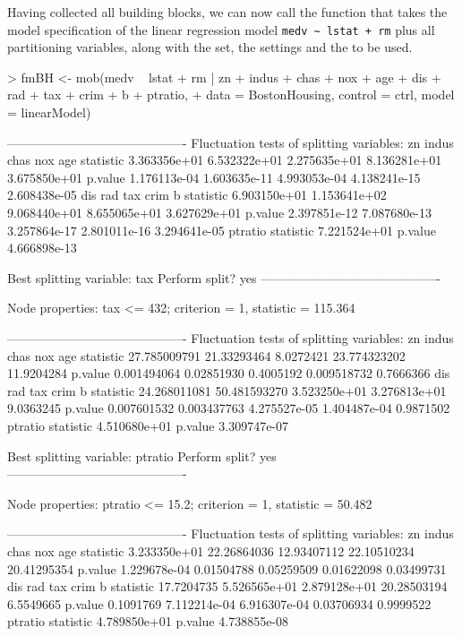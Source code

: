 \documentclass{Z}
\begin{document}
Having collected all building blocks, we can now call the function 
that takes the model specification of the linear regression model \verb:medv ~ lstat + rm:
plus all partitioning variables, along with the  set, the 
settings and the  to be used.

\begin{Schunk}
\begin{Sinput}
> fmBH <- mob(medv ~ lstat + rm | zn + indus + chas + nox + age + dis + rad + tax + crim + b + ptratio,
+   data = BostonHousing, control = ctrl, model = linearModel)
\end{Sinput}
\begin{Soutput}
-------------------------------------------
Fluctuation tests of splitting variables:
                    zn        indus         chas          nox          age
statistic 3.363356e+01 6.532322e+01 2.275635e+01 8.136281e+01 3.675850e+01
p.value   1.176113e-04 1.603635e-11 4.993053e-04 4.138241e-15 2.608438e-05
                   dis          rad          tax         crim            b
statistic 6.903150e+01 1.153641e+02 9.068440e+01 8.655065e+01 3.627629e+01
p.value   2.397851e-12 7.087680e-13 3.257864e-17 2.801011e-16 3.294641e-05
               ptratio
statistic 7.221524e+01
p.value   4.666898e-13

Best splitting variable: tax
Perform split? yes
-------------------------------------------

Node properties:
tax <= 432; criterion = 1, statistic = 115.364

-------------------------------------------
Fluctuation tests of splitting variables:
                    zn       indus      chas          nox        age
statistic 27.785009791 21.33293464 8.0272421 23.774323202 11.9204284
p.value    0.001494064  0.02851930 0.4005192  0.009518732  0.7666366
                   dis          rad          tax         crim         b
statistic 24.268011081 50.481593270 3.523250e+01 3.276813e+01 9.0363245
p.value    0.007601532  0.003437763 4.275527e-05 1.404487e-04 0.9871502
               ptratio
statistic 4.510680e+01
p.value   3.309747e-07

Best splitting variable: ptratio
Perform split? yes
-------------------------------------------

Node properties:
ptratio <= 15.2; criterion = 1, statistic = 50.482

-------------------------------------------
Fluctuation tests of splitting variables:
                    zn       indus        chas         nox         age
statistic 3.233350e+01 22.26864036 12.93407112 22.10510234 20.41295354
p.value   1.229678e-04  0.01504788  0.05259509  0.01622098  0.03499731
                 dis          rad          tax        crim         b
statistic 17.7204735 5.526565e+01 2.879128e+01 20.28503194 6.5549665
p.value    0.1091769 7.112214e-04 6.916307e-04  0.03706934 0.9999522
               ptratio
statistic 4.789850e+01
p.value   4.738855e-08


\end{Soutput}
\end{Schunk}
\end{document}
